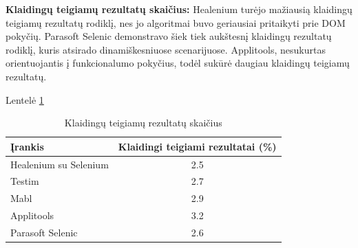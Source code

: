 \documentclass[
]{VUMIFPSkursinis}
\begin{document}
\textbf{Klaidingų teigiamų rezultatų skaičius:} Healenium turėjo mažiausią klaidingų teigiamų rezultatų rodiklį, nes jo algoritmai buvo geriausiai pritaikyti prie DOM pokyčių. Parasoft Selenic demonstravo šiek tiek aukštesnį klaidingų rezultatų rodiklį, kuris atsirado dinamiškesniuose scenarijuose. Applitools, nesukurtas orientuojantis į funkcionalumo pokyčius, todėl sukūrė daugiau klaidingų teigiamų rezultatų.

Lentelė \ref{tab:Klaidingų teigiamų rezultatų skaičius}

\begin{table}[H]\footnotesize
  \centering
  \caption{Klaidingų teigiamų rezultatų skaičius}
  {\begin{tabular}{|l|c|} \hline
    Įrankis & Klaidingi teigiami rezultatai (\%) \\
    \hline
    Healenium su Selenium & 2.5             \\
    Testim                & 2.7            \\
    Mabl                  & 2.9            \\
    Applitools            & 3.2             \\
    Parasoft Selenic      & 2.6             \\
    \hline
  \end{tabular}}
  \label{tab:Klaidingų teigiamų rezultatų skaičius}
\end{table}
\end{document}
